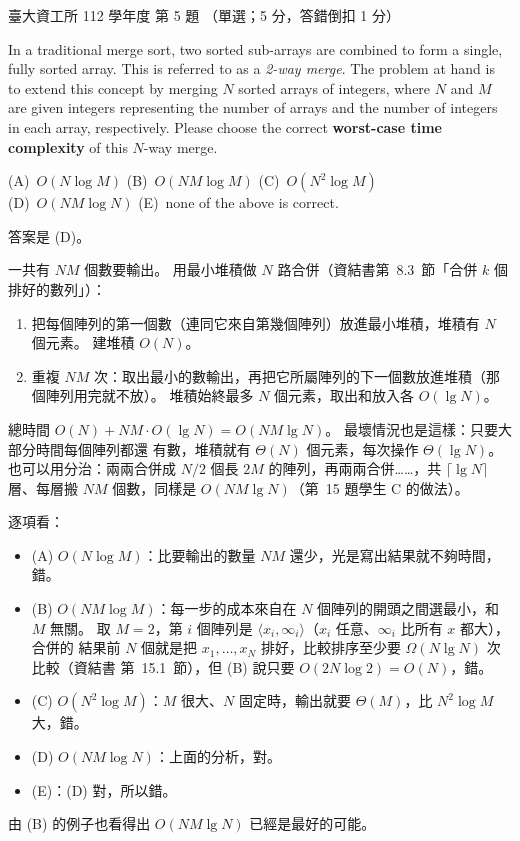 \begin{pastexam}[label={px:ntu-112-dsa-05}]{臺大資工所 112 學年度 第 5 題}
（單選；5 分，答錯倒扣 1 分）

In a traditional merge sort, two sorted sub-arrays are combined to form a single, fully sorted
array. This is referred to as a \textit{2-way merge}. The problem at hand is to extend this concept
by merging $N$ sorted arrays of integers, where $N$ and $M$ are given integers representing the
number of arrays and the number of integers in each array, respectively. Please choose the correct
\textbf{worst-case time complexity} of this $N$-way merge.

(A)~$O(N\log M)$ \qquad (B)~$O(NM\log M)$ \qquad (C)~$O(N^2\log M)$\\
(D)~$O(NM\log N)$ \qquad (E)~none of the above is correct.
\end{pastexam}

\begin{pastsoln}
答案是 (D)。

一共有 $NM$ 個數要輸出。 用最小堆積做 $N$ 路合併（資結書第~8.3~節「合併 $k$ 個排好的數列」）：
\begin{enumerate}
\item 把每個陣列的第一個數（連同它來自第幾個陣列）放進最小堆積，堆積有 $N$ 個元素。 建堆積
$O(N)$。
\item 重複 $NM$ 次：取出最小的數輸出，再把它所屬陣列的下一個數放進堆積（那個陣列用完就不放）。
堆積始終最多 $N$ 個元素，取出和放入各 $O(\lg N)$。
\end{enumerate}
總時間 $O(N) + NM \cdot O(\lg N) = O(NM \lg N)$。 最壞情況也是這樣：只要大部分時間每個陣列都還
有數，堆積就有 $\Theta(N)$ 個元素，每次操作 $\Theta(\lg N)$。 也可以用分治：兩兩合併成 $N/2$
個長 $2M$ 的陣列，再兩兩合併……，共 $\lceil \lg N \rceil$ 層、每層搬 $NM$ 個數，同樣是
$O(NM \lg N)$（第~15 題學生 C 的做法）。

逐項看：
\begin{itemize}
\item (A) $O(N \log M)$：比要輸出的數量 $NM$ 還少，光是寫出結果就不夠時間，錯。
\item (B) $O(NM \log M)$：每一步的成本來自在 $N$ 個陣列的開頭之間選最小，和 $M$ 無關。 取
$M = 2$，第 $i$ 個陣列是 $\langle x_i, \infty_i\rangle$（$x_i$ 任意、$\infty_i$ 比所有 $x$ 都大），合併的
結果前 $N$ 個就是把 $x_1, \ldots, x_N$ 排好，比較排序至少要 $\Omega(N \lg N)$ 次比較（資結書
第~15.1~節），但 (B) 說只要 $O(2N \log 2) = O(N)$，錯。
\item (C) $O(N^2 \log M)$：$M$ 很大、$N$ 固定時，輸出就要 $\Theta(M)$，比 $N^2 \log M$ 大，錯。
\item (D) $O(NM \log N)$：上面的分析，對。
\item (E)：(D) 對，所以錯。
\end{itemize}
由 (B) 的例子也看得出 $O(NM \lg N)$ 已經是最好的可能。
\end{pastsoln}
